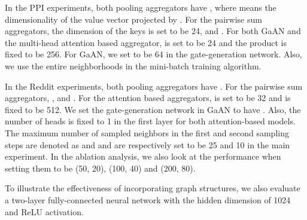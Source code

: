 \documentclass{article}
\begin{document}
	In the PPI experiments, both pooling aggregators have , where  means the dimensionality of the value vector projected by . For the pairwise sum aggregators, the dimension of the keys  is set to be 24,  and .
	For both GaAN and the multi-head attention based aggregator,  is set to be 24 and the product  is fixed to be 256. For GaAN, we set  to be 64 in the gate-generation network. Also, we use the entire neighborhoods in the mini-batch training algorithm.
	
	In the Reddit experiments, both pooling aggregators have . For the pairwise sum aggregators, ,  and . For the attention based aggregators,  is set to be 32 and  is fixed to be 512. We set the gate-generation network in GaAN to have . Also, the number of heads is fixed to 1 in the first layer for both attention-based models. The maximum number of sampled neighbors in the first and second sampling steps are denoted as  and  and are respectively set to be 25 and 10 in the main experiment. In the ablation analysis, we also look at the performance when setting them to be (50, 20), (100, 40) and (200, 80).
	
	To illustrate the effectiveness of incorporating graph structures, we also evaluate a two-layer fully-connected neural network with the hidden dimension of 1024 and ReLU activation.
\end{document}
